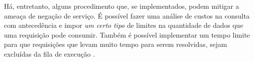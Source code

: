 Há, entretanto, alguns procedimento que, se implementados, podem mitigar a ameaça de negação de serviço. É possível fazer uma análise de custos na consulta com antecedência e impor \emph{um certo tipo} de limites na quantidade de dados que uma requisição pode consumir. Também é possível implementar um tempo limite para que requisições que levam muito tempo para serem resolvidas, sejam excluídas da fila de execução .


